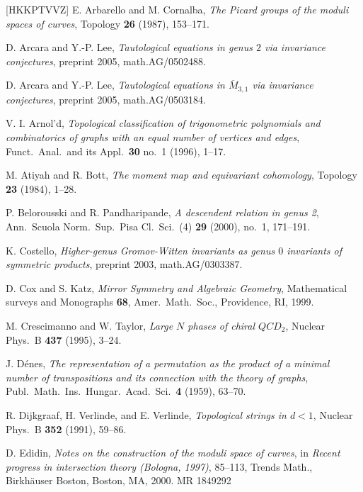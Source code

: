 \documentclass[12pt,letterpaper]{amsart}
\newcommand{\cited}{}
\begin{document}
\begin{thebibliography}{[HKKPTVVZ]}
 E. Arbarello and M. Cornalba, {\em The Picard groups
of the moduli spaces of curves}, Topology {\bf 26} (1987), 153--171.
\cited %

 D. Arcara and Y.-P. Lee, {\em Tautological
equations in genus $2$ via invariance conjectures}, preprint 2005,
math.AG/0502488.

 D. Arcara and Y.-P. Lee, {\em Tautological
equations in $\overline{M}_{3,1}$ via invariance conjectures}, preprint 2005,
math.AG/0503184.

 {V. I. Arnol'd},
{\em Topological classification of
       trigonometric polynomials and combinatorics of graphs with an
       equal number of vertices and edges},
Funct.\  Anal.\  and its Appl.\
{\bf 30} no.\ 1 (1996), 1--17.
\cited

 M. Atiyah and R. Bott, {\em The moment map and
equivariant cohomology}, Topology {\bf 23} (1984), 1--28. \cited

 P. Belorousski and R. Pandharipande, {\em A
descendent relation in genus 2}, Ann.\ Scuola Norm.\ Sup.\ Pisa Cl.\ Sci.\ (4) {\bf
29} (2000), no.\ 1, 171--191.   
\cited

 K. Costello, {\em Higher-genus Gromov-Witten invariants
as genus $0$ invariants of symmetric products}, preprint 2003, math.AG/0303387. \cited

D. Cox and S. Katz, {\em Mirror Symmetry and 
Algebraic Geometry}, Mathematical surveys and Monographs {\bf 68}, Amer.\
Math.\ Soc., Providence, RI, 1999.\cited

 {M. Crescimanno and W. Taylor},
 {\em Large $N$ phases of chiral $QCD_2$},
 Nuclear Phys.\ B
 {\bf 437} (1995), 3--24.
 \cited

 {J. D\'{e}nes},
 {\em The representation
 of a permutation as the product of a minimal number of transpositions
 and its connection with the theory of graphs},
 Publ.\ Math.\ Ins.\ Hungar.\ Acad.\ Sci.\
 {\bf 4} (1959), 63--70.
 \cited

 R. Dijkgraaf, H. Verlinde, and E. Verlinde,
{\em Topological strings in $d<1$}, Nuclear Phys.\ B {\bf 352} (1991), 59--86.
\cited 

\bibitem[E]{edidin} D. Edidin, {\em Notes on the construction of the moduli
space of curves}, in {\em Recent progress in intersection theory (Bologna, 1997)}, 
85--113, Trends Math., Birkh\"auser Boston, Boston, MA, 2000. MR 1849292  \cited


\end{thebibliography}
\end{document}
